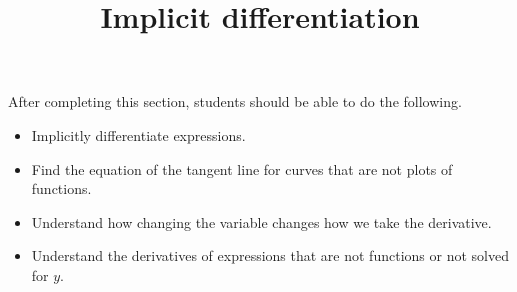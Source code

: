 \documentclass{ximera}
\title{Implicit differentiation}
\begin{document}
\begin{abstract}
\end{abstract}

\maketitle

\begin{sectionOutcomes}

After completing this section, students should be able to do the following.

\begin{itemize}
	\item Implicitly differentiate expressions.
	\item Find the equation of the tangent line for curves that
          are not plots of functions.
	\item Understand how changing the variable changes how we take
          the derivative.
	\item Understand the derivatives of expressions that are not
          functions or not solved for $y$.
\end{itemize}

\end{sectionOutcomes}
\end{document}
